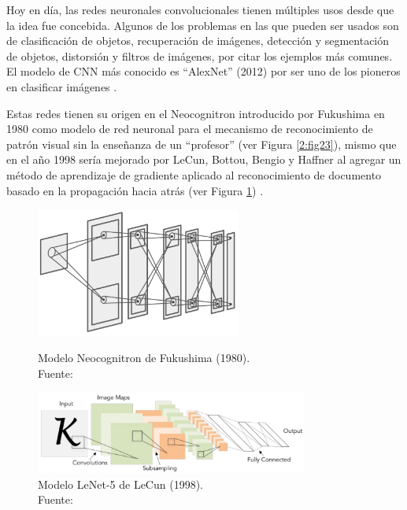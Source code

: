 \begin{itemize}
\begin{itemize}
		Hoy en día, las redes neuronales convolucionales tienen múltiples usos desde que la idea fue concebida. Algunos de los problemas en las que pueden ser usados son de clasificación de objetos, recuperación de imágenes, detección y segmentación de objetos, distorsión y filtros de imágenes, por citar los ejemplos más comunes. El modelo de CNN más conocido es “AlexNet” (2012) por ser uno de los pioneros en clasificar imágenes \parencite{tec_li2019cnn}.
		
		Estas redes tienen su origen en el Neocognitron introducido por Fukushima en 1980 como modelo de red neuronal para el mecanismo de reconocimiento de patrón visual sin la enseñanza de un “profesor” (ver Figura \ref{2:fig23}), mismo que en el año 1998 sería mejorado por LeCun, Bottou, Bengio y Haffner al agregar un método de aprendizaje de gradiente aplicado al reconocimiento de documento basado en la propagación hacia atrás (ver Figura \ref{2:fig24}) \parencite{tec_li2019cnn}.
		\begin{figure}[htbp]
			\begin{center}
				\includegraphics[width=0.6\textwidth]{2/figures/neocognitron.jpg}
				\caption[Modelo Neocognitron de Fukushima (1980)]{Modelo Neocognitron de Fukushima (1980).\\
				Fuente: \cite{tec_li2019cnn}}
				\label{2:fig23}
				
				\includegraphics[width=0.8\textwidth]{2/figures/lenet5.jpg}
				\caption[Modelo LeNet-5 de LeCun (1998)]{Modelo LeNet-5 de LeCun (1998).\\
				Fuente: \cite{tec_li2019cnn}}
				\label{2:fig24}
			\end{center}
		\end{figure}
		

\end{itemize}
\end{itemize}
